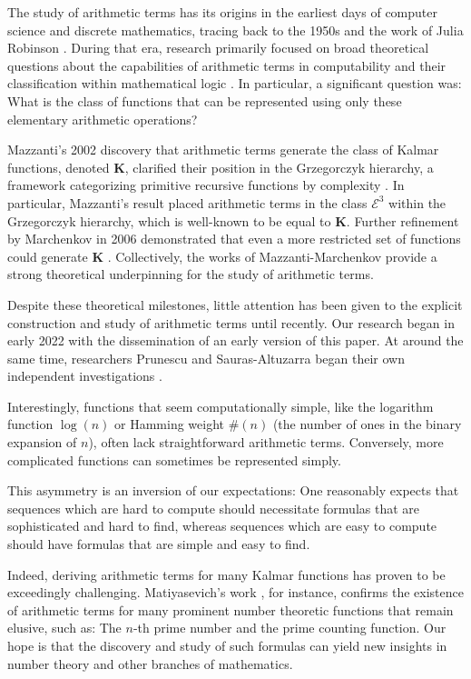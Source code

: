 \documentclass[10pt,a4paper]{article}
\theoremstyle{plain}
\begin{document}
The study of arithmetic terms has its origins in the earliest days of computer science and discrete mathematics, tracing back to the 1950s and the work of Julia Robinson \cite{robinson1952arithmetic}. During that era, research primarily focused on broad theoretical questions about the capabilities of arithmetic terms in computability and their classification within mathematical logic \cite{herman1969elementary, grzegorczyk1953someclasses, robinson1952arithmetic}. In particular, a significant question was: What is the class of functions that can be represented using only these elementary arithmetic operations?

Mazzanti's 2002 discovery that arithmetic terms generate the class of Kalmar functions, denoted $\textbf{K}$, clarified their position in the Grzegorczyk hierarchy, a framework categorizing primitive recursive functions by complexity \cite{mazzanti2002plainbases, grzegorczyk1953someclasses}. In particular, Mazzanti's result placed arithmetic terms in the class $\mathcal{E}^3$ within the Grzegorczyk hierarchy, which is well-known to be equal to $\textbf{K}$. Further refinement by Marchenkov in 2006 demonstrated that even a more restricted set of functions could generate $\textbf{K}$ \cite{marchenkov2007superposition}. Collectively, the works of Mazzanti-Marchenkov provide a strong theoretical underpinning for the study of arithmetic terms.

Despite these theoretical milestones, little attention has been given to the explicit construction and study of arithmetic terms until recently. Our research began in early 2022 with the dissemination of an early version of this paper. At around the same time, researchers Prunescu and Sauras-Altuzarra began their own independent investigations \cite{prunescu2024factorial,prunescu2024representation}.

Interestingly, functions that seem computationally simple, like the logarithm function $\log(n)$ or Hamming weight $\#(n)$ (the number of ones in the binary expansion of $n$), often lack straightforward arithmetic terms. Conversely, more complicated functions can sometimes be represented simply.

This asymmetry is an inversion of our expectations: One reasonably expects that sequences which are hard to compute should necessitate formulas that are sophisticated and hard to find, whereas sequences which are easy to compute should have formulas that are simple and easy to find.

Indeed, deriving arithmetic terms for many Kalmar functions has proven to be exceedingly challenging. Matiyasevich's work \cite{matiyasevich1980diophantine}, for instance, confirms the existence of arithmetic terms for many prominent number theoretic functions that remain elusive, such as: The $n$-th prime number and the prime counting function. Our hope is that the discovery and study of such formulas can yield new insights in number theory and other branches of mathematics.
\end{document}

